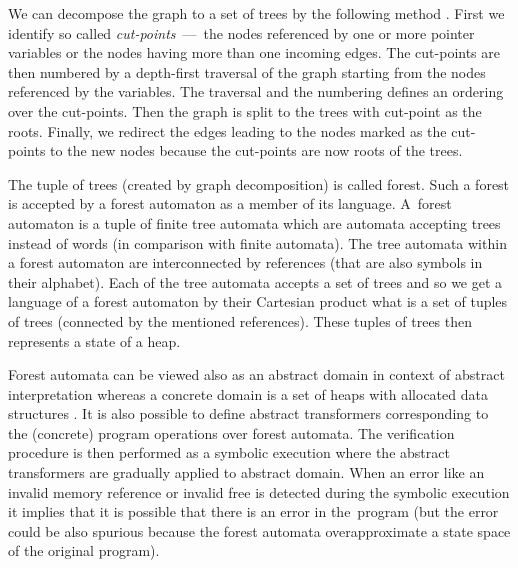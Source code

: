 \documentclass[fleqn,11pt]{ExcelAtFIT} %
\begin{document}
We can decompose the graph to a set of trees by the following method \cite{forester11}.
First we identify so called \emph{cut-points} \,---\, the nodes referenced by
one or more pointer variables or the nodes having more than one incoming edges.
The cut-points are then numbered by a depth-first traversal of the graph starting from
the nodes referenced by the variables.
The traversal and the numbering defines an ordering over the cut-points.
Then the graph is split to the trees with cut-point as the roots.
Finally, we redirect the edges leading to the nodes marked as the cut-points to the new nodes because the cut-points are now roots of the trees.

The tuple of trees (created by graph decomposition) is called forest.
Such a forest is accepted by a forest automaton as a member of its language.
A~forest automaton is a tuple of finite tree automata which are automata accepting trees instead of words (in comparison with finite automata).
The tree automata within a forest automaton are interconnected by references (that are also symbols in their alphabet).
Each of the tree automata accepts a set of trees and so we get a language of a forest
automaton by their Cartesian product what is a set of tuples of trees (connected by the mentioned references).
These tuples of trees then represents a state of a heap. %

Forest automata can be viewed also as an abstract domain in context of abstract interpretation
whereas a concrete domain is a set of heaps with allocated data structures \cite{atva13}.
It is also possible to define abstract transformers corresponding to the (concrete) program operations over forest automata.
The verification procedure is then performed as a symbolic execution
where the abstract transformers are gradually applied to abstract domain.
When an error like an invalid memory reference or invalid free is detected during the symbolic
execution it implies that it is possible that there is an error in the~program (but the error could be also spurious because
the forest automata overapproximate a state space of the original program).
\end{document}
